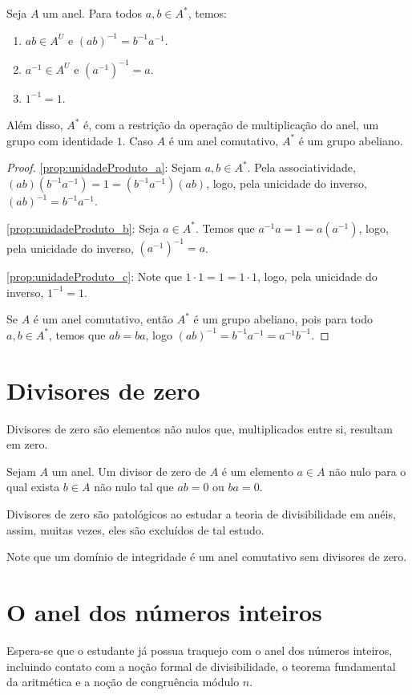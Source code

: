 \begin{prop}
Seja $A$ um anel. Para todos $a, b \in A^*$, temos:
\begin{enumerate}[label=\alph*)]
    \item $ab\in A^U$ e $(ab)^{-1}=b^{-1}a^{-1}$.\label{prop:unidadeProduto_a}
    \item $a^{-1}\in A^U$ e $(a^{-1})^{-1}=a$.\label{prop:unidadeProduto_b}
    \item $1^{-1}=1$.\label{prop:unidadeProduto_c}
\end{enumerate}
Além disso, $A^*$ é, com a restrição da operação de multiplicação do anel, um grupo com identidade $1$. Caso $A$ é um anel comutativo, $A^*$ é um grupo abeliano.
\end{prop}
\begin{proof}
    \ref{prop:unidadeProduto_a}: Sejam $a, b \in A^*$. Pela associatividade, $(ab)(b^{-1}a^{-1})=1=(b^{-1}a^{-1})(ab)$, logo, pela unicidade do inverso, $(ab)^{-1}=b^{-1}a^{-1}$.

    \ref{prop:unidadeProduto_b}: Seja $a \in A^*$. Temos que $a^{-1}a=1=a(a^{-1})$, logo, pela unicidade do inverso, $(a^{-1})^{-1}=a$.

    \ref{prop:unidadeProduto_c}: Note que $1\cdot 1=1=1\cdot 1$, logo, pela unicidade do inverso, $1^{-1}=1$.

    Se $A$ é um anel comutativo, então $A^*$ é um grupo abeliano, pois para todo $a, b \in A^*$, temos que $ab=ba$, logo $(ab)^{-1}=b^{-1}a^{-1}=a^{-1}b^{-1}$.
\end{proof}

\section{Divisores de zero}
Divisores de zero são elementos não nulos que, multiplicados entre si, resultam em zero.

\begin{definition}
Sejam $A$ um anel. Um divisor de zero de $A$ é um elemento $a \in A$ não nulo para o qual exista $b \in A$ não nulo tal que $ab=0$ ou $ba=0$.
\end{definition}

Divisores de zero são patológicos ao estudar a teoria de divisibilidade em anéis, assim, muitas vezes, eles são excluídos de tal estudo.

Note que um domínio de integridade é um anel comutativo sem divisores de zero.
\section{O anel dos números inteiros}
Espera-se que o estudante já possua traquejo com o anel dos números inteiros, incluindo contato com a noção formal de divisibilidade, o teorema fundamental da aritmética e a noção de congruência módulo $n$.

